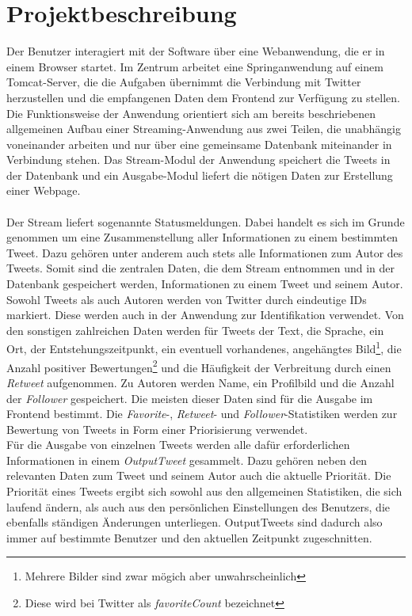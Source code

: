 \chapter{Projektbeschreibung}
Der Benutzer interagiert mit der Software über eine Webanwendung, die er in einem Browser startet. Im Zentrum arbeitet eine Springanwendung auf einem Tomcat-Server, die die Aufgaben übernimmt die Verbindung mit Twitter herzustellen und die empfangenen Daten dem Frontend zur Verfügung zu stellen. Die Funktionsweise der Anwendung orientiert sich am bereits beschriebenen allgemeinen Aufbau einer Streaming-Anwendung aus zwei Teilen, die unabhängig voneinander arbeiten und nur über eine gemeinsame Datenbank miteinander in Verbindung stehen. Das Stream-Modul der Anwendung speichert die Tweets in der Datenbank und ein Ausgabe-Modul liefert die nötigen Daten zur Erstellung einer Webpage.
\\\\
Der Stream liefert sogenannte Statusmeldungen. Dabei handelt es sich im Grunde genommen um eine Zusammenstellung aller Informationen zu einem bestimmten Tweet. Dazu gehören unter anderem auch stets alle Informationen zum Autor des Tweets. Somit sind die zentralen Daten, die dem Stream entnommen und in der Datenbank gespeichert werden, Informationen zu einem Tweet und seinem Autor. Sowohl Tweets als auch Autoren werden von Twitter durch eindeutige IDs markiert. Diese werden auch in der Anwendung zur Identifikation verwendet. Von den sonstigen zahlreichen Daten werden für Tweets der Text, die Sprache, ein Ort, der Entstehungszeitpunkt, ein eventuell vorhandenes, angehängtes Bild\footnote{Mehrere Bilder sind zwar mögich aber unwahrscheinlich}, die Anzahl positiver Bewertungen\footnote{Diese wird bei Twitter als  \textit{favoriteCount} bezeichnet} und die Häufigkeit der Verbreitung durch einen \textit{Retweet} aufgenommen. Zu Autoren werden Name, ein Profilbild und die Anzahl der \textit{Follower} gespeichert. Die meisten dieser Daten sind für die Ausgabe im Frontend bestimmt. Die \textit{Favorite}-, \textit{Retweet}- und \textit{Follower}-Statistiken werden zur Bewertung von Tweets in Form einer Priorisierung verwendet. \\
Für die Ausgabe von einzelnen Tweets werden alle dafür erforderlichen Informationen in einem \textit{OutputTweet} gesammelt. Dazu gehören neben den relevanten Daten zum Tweet und seinem Autor auch die aktuelle Priorität. Die Priorität eines Tweets ergibt sich sowohl aus den allgemeinen Statistiken, die sich laufend ändern, als auch aus den persönlichen Einstellungen des Benutzers, die ebenfalls ständigen Änderungen unterliegen. OutputTweets sind dadurch also immer auf bestimmte Benutzer und den aktuellen Zeitpunkt zugeschnitten.

